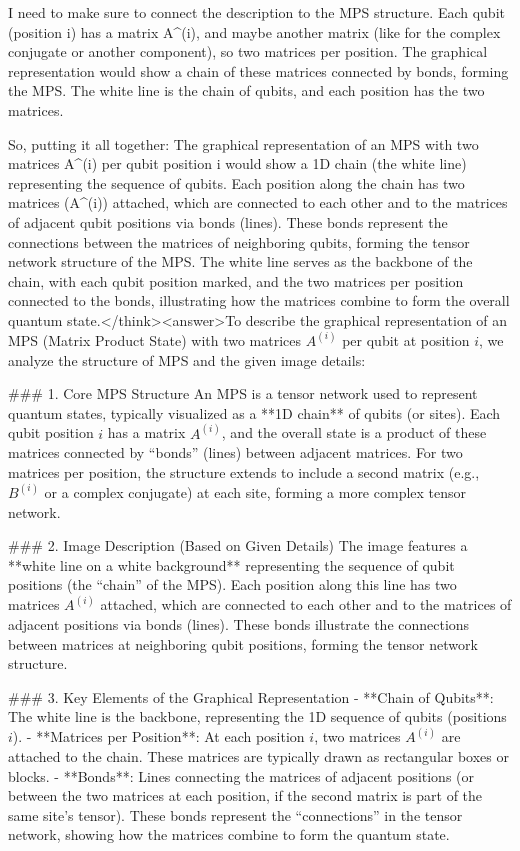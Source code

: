I need to make sure to connect the description to the MPS structure. Each qubit (position i) has a matrix A^(i), and maybe another matrix (like for the complex conjugate or another component), so two matrices per position. The graphical representation would show a chain of these matrices connected by bonds, forming the MPS. The white line is the chain of qubits, and each position has the two matrices. 

So, putting it all together: The graphical representation of an MPS with two matrices A^(i) per qubit position i would show a 1D chain (the white line) representing the sequence of qubits. Each position along the chain has two matrices (A^(i)) attached, which are connected to each other and to the matrices of adjacent qubit positions via bonds (lines). These bonds represent the connections between the matrices of neighboring qubits, forming the tensor network structure of the MPS. The white line serves as the backbone of the chain, with each qubit position marked, and the two matrices per position connected to the bonds, illustrating how the matrices combine to form the overall quantum state.</think><answer>To describe the graphical representation of an MPS (Matrix Product State) with two matrices \( A^{(i)} \) per qubit at position \( i \), we analyze the structure of MPS and the given image details:  

### 1. Core MPS Structure  
An MPS is a tensor network used to represent quantum states, typically visualized as a **1D chain** of qubits (or sites). Each qubit position \( i \) has a matrix \( A^{(i)} \), and the overall state is a product of these matrices connected by “bonds” (lines) between adjacent matrices. For two matrices per position, the structure extends to include a second matrix (e.g., \( B^{(i)} \) or a complex conjugate) at each site, forming a more complex tensor network.    

### 2. Image Description (Based on Given Details)  
The image features a **white line on a white background** representing the sequence of qubit positions (the “chain” of the MPS). Each position along this line has two matrices \( A^{(i)} \) attached, which are connected to each other and to the matrices of adjacent positions via bonds (lines). These bonds illustrate the connections between matrices at neighboring qubit positions, forming the tensor network structure.  

### 3. Key Elements of the Graphical Representation  
- **Chain of Qubits**: The white line is the backbone, representing the 1D sequence of qubits (positions \( i \)).  
- **Matrices per Position**: At each position \( i \), two matrices \( A^{(i)} \) are attached to the chain. These matrices are typically drawn as rectangular boxes or blocks.  
- **Bonds**: Lines connecting the matrices of adjacent positions (or between the two matrices at each position, if the second matrix is part of the same site’s tensor). These bonds represent the “connections” in the tensor network, showing how the matrices combine to form the quantum state.    

